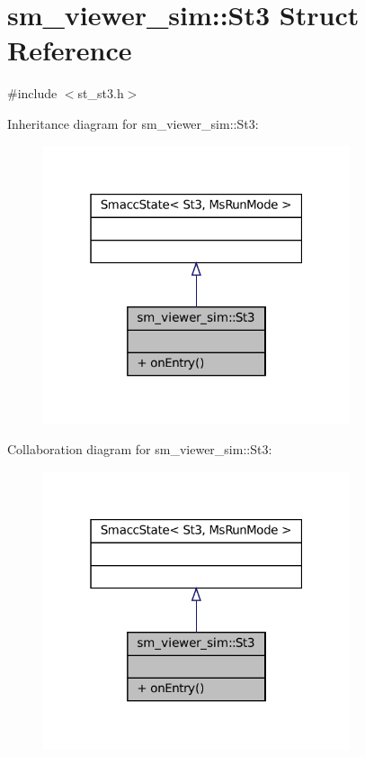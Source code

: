 \hypertarget{structsm__viewer__sim_1_1St3}{}\section{sm\+\_\+viewer\+\_\+sim\+:\+:St3 Struct Reference}
\label{structsm__viewer__sim_1_1St3}


{\ttfamily \#include $<$st\+\_\+st3.\+h$>$}



Inheritance diagram for sm\+\_\+viewer\+\_\+sim\+:\+:St3\+:
\nopagebreak
\begin{figure}[H]
\begin{center}
\leavevmode
\includegraphics[width=256pt]{structsm__viewer__sim_1_1St3__inherit__graph}
\end{center}
\end{figure}


Collaboration diagram for sm\+\_\+viewer\+\_\+sim\+:\+:St3\+:
\nopagebreak
\begin{figure}[H]
\begin{center}
\leavevmode
\includegraphics[width=256pt]{structsm__viewer__sim_1_1St3__coll__graph}
\end{center}
\end{figure}
